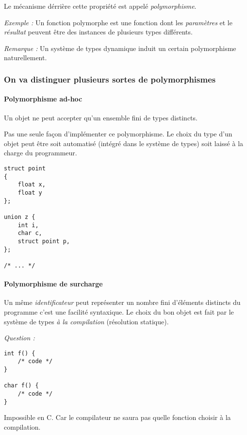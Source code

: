 \documentclass[]{article}
\let\oldparagraph\paragraph
\renewcommand{\paragraph}[1]{\oldparagraph{#1}\mbox{}}
\begin{document}
Le mécanisme dérrière cette propriété est appelé \emph{polymorphisme}.

\emph{Exemple :} Un fonction polymorphe est une fonction dont les
\emph{paramètres} et le \emph{résultat} peuvent être des instances de
plusieurs types différents.

\emph{Remarque :} Un système de types dynamique induit un certain
polymorphisme naturellement.

\subsubsection{On va distinguer plusieurs sortes de
polymorphismes}\label{on-va-distinguer-plusieurs-sortes-de-polymorphismes}

\paragraph{Polymorphisme ad-hoc}\label{polymorphisme-ad-hoc}

Un objet ne peut accepter qu'un ensemble fini de types distincts.

Pas une seule façon d'implémenter ce polymorphisme. Le choix du type
d'un objet peut être soit automatisé (intégré dans le système de types)
soit laissé à la charge du programmeur.

\begin{verbatim}
struct point
{
    float x,
    float y
};

union z {
    int i,
    char c,
    struct point p,
};

/* ... */
\end{verbatim}

\paragraph{Polymorphisme de surcharge}\label{polymorphisme-de-surcharge}

Un même \emph{identificateur} peut représenter un nombre fini d'éléments
distincts du programme c'est une facilité syntaxique. Le choix du bon
objet est fait par le système de types \emph{à la compilation}
(résolution statique).

\emph{Question :}

\begin{verbatim}
int f() {
    /* code */
}

char f() {
    /* code */
}
\end{verbatim}

Impossible en C. Car le compilateur ne saura pas quelle fonction choisir
à la compilation.
\end{document}
